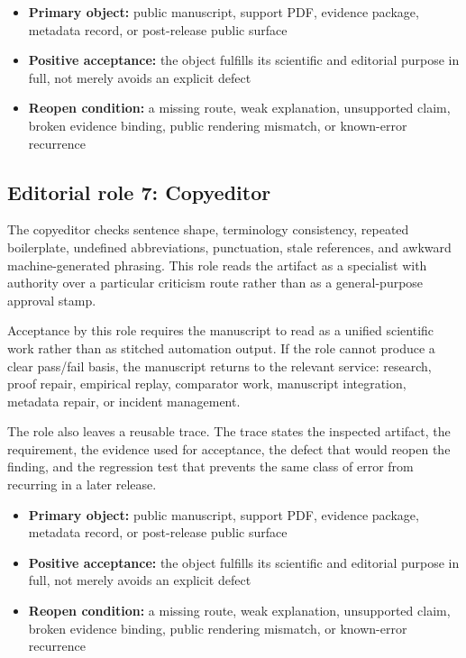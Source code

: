 \begin{itemize}[leftmargin=1.8em]

\item \textbf{Primary object:} public manuscript, support PDF, evidence package, metadata record, or post-release public surface

\item \textbf{Positive acceptance:} the object fulfills its scientific and editorial purpose in full, not merely avoids an explicit defect

\item \textbf{Reopen condition:} a missing route, weak explanation, unsupported claim, broken evidence binding, public rendering mismatch, or known-error recurrence

\end{itemize}

\subsection{Editorial role 7: Copyeditor}

The copyeditor checks sentence shape, terminology consistency, repeated boilerplate, undefined abbreviations, punctuation, stale references, and awkward machine-generated phrasing. This role reads the artifact as a specialist with authority over a particular criticism route rather than as a general-purpose approval stamp.


Acceptance by this role requires the manuscript to read as a unified scientific work rather than as stitched automation output. If the role cannot produce a clear pass/fail basis, the manuscript returns to the relevant service: research, proof repair, empirical replay, comparator work, manuscript integration, metadata repair, or incident management.


The role also leaves a reusable trace. The trace states the inspected artifact, the requirement, the evidence used for acceptance, the defect that would reopen the finding, and the regression test that prevents the same class of error from recurring in a later release.


\begin{itemize}[leftmargin=1.8em]

\item \textbf{Primary object:} public manuscript, support PDF, evidence package, metadata record, or post-release public surface

\item \textbf{Positive acceptance:} the object fulfills its scientific and editorial purpose in full, not merely avoids an explicit defect

\item \textbf{Reopen condition:} a missing route, weak explanation, unsupported claim, broken evidence binding, public rendering mismatch, or known-error recurrence

\end{itemize}

